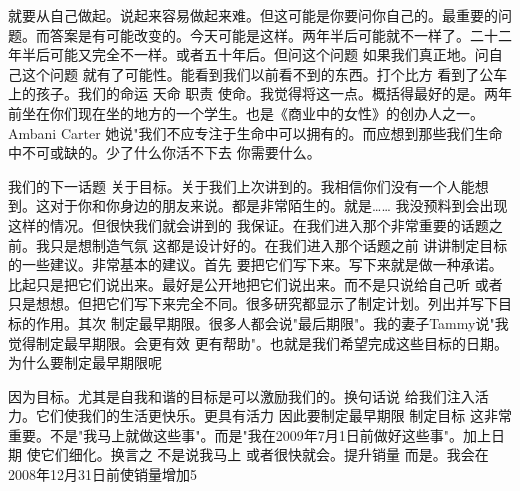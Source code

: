 就要从自己做起。说起来容易做起来难。但这可能是你要问你自己的。最重要的问题。而答案是有可能改变的。今天可能是这样。两年半后可能就不一样了。二十二年半后可能又完全不一样。或者五十年后。但问这个问题 如果我们真正地。问自己这个问题 就有了可能性。能看到我们以前看不到的东西。打个比方 看到了公车上的孩子。我们的命运 天命 职责 使命。我觉得将这一点。概括得最好的是。两年前坐在你们现在坐的地方的一个学生。也是《商业中的女性》的创办人之一。Ambani Carter 她说"我们不应专注于生命中可以拥有的。而应想到那些我们生命中不可或缺的。少了什么你活不下去 你需要什么。 

我们的下一话题 关于目标。关于我们上次讲到的。我相信你们没有一个人能想到。这对于你和你身边的朋友来说。都是非常陌生的。就是…… 我没预料到会出现这样的情况。但很快我们就会讲到的 我保证。在我们进入那个非常重要的话题之前。我只是想制造气氛 这都是设计好的。在我们进入那个话题之前 讲讲制定目标的一些建议。非常基本的建议。首先 要把它们写下来。写下来就是做一种承诺。比起只是把它们说出来。最好是公开地把它们说出来。而不是只说给自己听 或者只是想想。但把它们写下来完全不同。很多研究都显示了制定计划。列出并写下目标的作用。其次 制定最早期限。很多人都会说"最后期限"。我的妻子Tammy说"我觉得制定最早期限。会更有效 更有帮助"。也就是我们希望完成这些目标的日期。为什么要制定最早期限呢 

因为目标。尤其是自我和谐的目标是可以激励我们的。换句话说 给我们注入活力。它们使我们的生活更快乐。更具有活力 因此要制定最早期限 制定目标 这非常重要。不是"我马上就做这些事"。而是"我在2009年7月1日前做好这些事"。加上日期 使它们细化。换言之 不是说我马上 或者很快就会。提升销量 而是。我会在2008年12月31日前使销量增加5%


